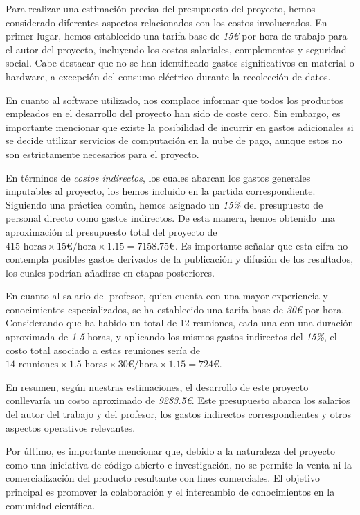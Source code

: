 Para realizar una estimación precisa del presupuesto del proyecto, hemos considerado diferentes aspectos relacionados 
con los costos involucrados. En primer lugar, hemos establecido una tarifa base de \textit{15€} por hora de trabajo 
para el autor del proyecto, incluyendo los costos salariales, complementos y seguridad social. Cabe destacar que no 
se han identificado gastos significativos en material o hardware, a excepción del consumo eléctrico durante la recolección 
de datos.

En cuanto al software utilizado, nos complace informar que todos los productos empleados en el desarrollo del proyecto 
han sido de coste cero. Sin embargo, es importante mencionar que existe la posibilidad de incurrir en gastos adicionales 
si se decide utilizar servicios de computación en la nube de pago, aunque estos no son estrictamente necesarios para el
 proyecto.

En términos de \textit{costos indirectos}, los cuales abarcan los gastos generales imputables al proyecto, los hemos 
incluido en la partida correspondiente. Siguiendo una práctica común, hemos asignado un \textit{15\%} del presupuesto 
de personal directo como gastos indirectos. De esta manera, hemos obtenido una aproximación al presupuesto total del 
proyecto de $415 \text{ horas} \times 15\textit{€}/\text{hora} \times 1.15 = 7158.75\textit{€}$. Es importante señalar que esta cifra 
no contempla posibles gastos derivados de la publicación y difusión de los resultados, los cuales podrían añadirse en 
etapas posteriores.

En cuanto al salario del profesor, quien cuenta con una mayor experiencia y conocimientos especializados, se ha 
establecido una tarifa base de \textit{30€} por hora. Considerando que ha habido un total de 12 reuniones, cada 
una con una duración aproximada de \textit{1.5} horas, y aplicando los mismos gastos indirectos del \textit{15\%}, 
el costo total asociado a estas reuniones sería de $14 \text{ reuniones} \times 1.5  \text{ horas} \times 30\textit{€}/\text{hora} \times 1.15 = 724\textit{€}$.

En resumen, según nuestras estimaciones, el desarrollo de este proyecto conllevaría un costo aproximado de \textit{9283.5€}. 
Este presupuesto abarca los salarios del autor del trabajo y del profesor, los gastos indirectos correspondientes y otros 
aspectos operativos relevantes.

Por último, es importante mencionar que, debido a la naturaleza del proyecto como una iniciativa de código abierto e 
investigación, no se permite la venta ni la comercialización del producto resultante con fines comerciales. El objetivo 
principal es promover la colaboración y el intercambio de conocimientos en la comunidad científica.

